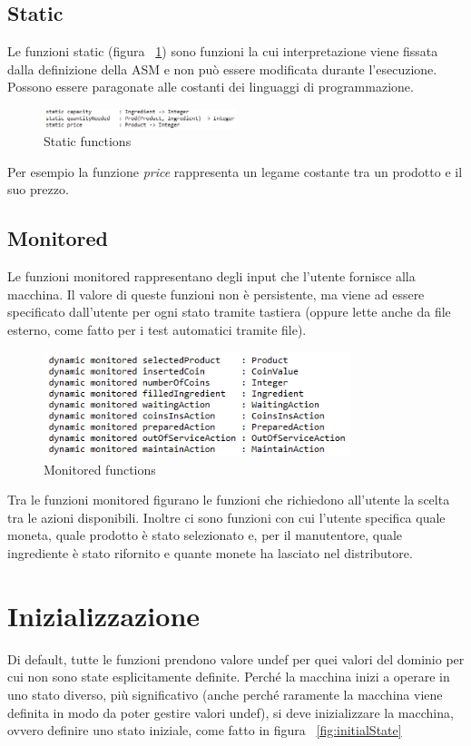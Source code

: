 \subsection{Static}
Le funzioni static (figura ~\ref{fig:staticFunc}) sono funzioni la cui interpretazione viene fissata dalla definizione della ASM e non può essere modificata durante l’esecuzione.
Possono essere paragonate alle costanti dei linguaggi di programmazione.
\begin{figure}[h]
	\centering
	\includegraphics[width=0.5\textwidth]{Immagini/StaticFunction.png}
	\caption{Static functions}
	\label{fig:staticFunc}
\end{figure}
Per esempio la funzione \textit{price} rappresenta un legame costante tra un prodotto e il suo prezzo. 

\subsection{Monitored}
Le funzioni monitored rappresentano degli input che l’utente fornisce alla macchina. Il valore di queste funzioni non è persistente, ma viene ad essere specificato dall’utente per ogni stato tramite tastiera (oppure lette anche da file esterno, come fatto per i test automatici tramite file).
\begin{figure}[h]
	\centering
	\includegraphics[width=0.8\textwidth]{Immagini/MonitoredFunc.png}
	\caption{Monitored functions}
	\label{fig:monitoredFunc}
\end{figure}
Tra le funzioni monitored figurano le funzioni che richiedono all’utente la scelta tra le azioni disponibili. Inoltre ci sono funzioni con cui l’utente specifica quale moneta, quale prodotto è stato selezionato e, per il manutentore, quale ingrediente è stato rifornito e quante monete ha lasciato nel distributore.

\section{Inizializzazione}
Di default, tutte le funzioni prendono valore undef per quei valori del dominio per cui non sono state esplicitamente definite.	
Perché la macchina inizi a operare in uno stato diverso, più significativo (anche perché raramente la macchina viene definita in modo da poter gestire valori undef), si deve inizializzare la macchina, ovvero definire uno stato iniziale, come fatto in figura ~\ref{fig:initialState}


